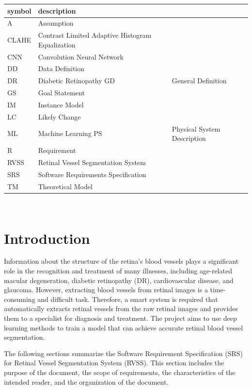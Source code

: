 \documentclass[12pt]{article}
\begin{document}
\renewcommand{\arraystretch}{1.2}
\begin{longtable*}{l l} 
  \toprule		
  \textbf{symbol} & \textbf{description}\\
  \midrule
 
  A & Assumption\\
  CLAHE & Contrast Limited Adaptive Histogram Equalization\\
  CNN & Convolution Neural Network\\
  DD & Data Definition\\
  DR & Diabetic Retinopathy
  GD & General Definition\\
  GS & Goal Statement\\
  IM & Instance Model\\
  LC & Likely Change\\
  ML & Machine Learning
  PS & Physical System Description\\
  R & Requirement\\
  RVSS & Retinal Vessel Segmentation System\\ 
  SRS & Software Requirements Specification\\
  TM & Theoretical Model\\
  \bottomrule
\end{longtable*}\\

\newpage


\section{Introduction}

Information about the structure of the retina’s blood vessels plays a significant role in the recognition and treatment of many illnesses, including age-related macular degeneration, diabetic retinopathy (DR), cardiovascular disease, and glaucoma. However, extracting blood vessels from retinal images is a time-consuming and difficult task. Therefore, a smart system is required that automatically extracts retinal vessels from the raw retinal images and provides them to a 
specialist for diagnosis and treatment. The project aims to use deep learning methods to train a model that can achieve accurate retinal blood vessel segmentation.

The following sections summarize the Software Requirement Specification (SRS) for Retinal Vessel Segmentation System (RVSS). This section includes the purpose of the document, the scope of requirements, the characteristics of the intended reader, and the organization of the document.   
\end{document}
